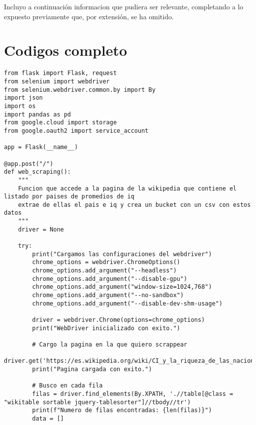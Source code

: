 \appendix
Incluyo a continuación informacion que pudiera ser relevante, completando a lo expuesto previamente que, por extensión, se ha omitido.
\section{Codigos completo}
\begin{lstlisting}[caption = {Código de web scrapping completo.}, label = WBSCode]
from flask import Flask, request
from selenium import webdriver
from selenium.webdriver.common.by import By
import json
import os
import pandas as pd
from google.cloud import storage
from google.oauth2 import service_account

app = Flask(__name__)

@app.post("/")
def web_scraping():
    """
    Funcion que accede a la pagina de la wikipedia que contiene el listado por paises de promedios de iq
    extrae de ellas el pais e iq y crea un bucket con un csv con estos datos
    """
    driver = None

    try:
        print("Cargamos las configuraciones del webdriver")
        chrome_options = webdriver.ChromeOptions()
        chrome_options.add_argument("--headless")
        chrome_options.add_argument("--disable-gpu")
        chrome_options.add_argument("window-size=1024,768")
        chrome_options.add_argument("--no-sandbox")
        chrome_options.add_argument("--disable-dev-shm-usage") 

        driver = webdriver.Chrome(options=chrome_options)
        print("WebDriver inicializado con exito.")

        # Cargo la pagina en la que quiero scrappear
        driver.get('https://es.wikipedia.org/wiki/CI_y_la_riqueza_de_las_naciones')
        print("Pagina cargada con exito.")
        
        # Busco en cada fila
        filas = driver.find_elements(By.XPATH, './/table[@class = "wikitable sortable jquery-tablesorter"]//tbody//tr')
        print(f"Numero de filas encontradas: {len(filas)}")
        data = []
        

\end{lstlisting}
